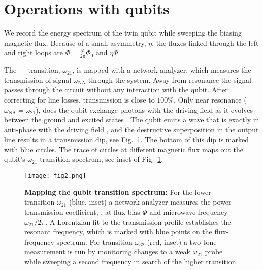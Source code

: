 
\section{Operations with qubits}
\label{sec:characterisation}


\noindent We record the energy spectrum of  the twin qubit while sweeping the biasing magnetic
flux.  Because of a  small asymmetry, $\eta$, the fluxes linked through the  left and right loops
are $ \Phi = \frac{\varphi}{2\pi}\Phi_0$ and $ \eta\Phi $.

The ~\ilra~  transition, $\omega_{21}$,  is mapped with  a network  analyzer, which
measures the transmission  of signal $\omega_{\text{NA}}$ through the system.   Away from resonance
the signal passes through the circuit without any interaction with the qubit. After correcting
for   line   losses,  transmission   is   close   to  $   100\%   $.    Only  near   resonance
($\omega_{\text{NA}}=\omega_{21}$), does the qubit exchange photons with the driving field as it evolves
between the ground and excited states \cite{rabi}.  The  qubit emits a wave that is exactly in
anti-phase with the driving field \cite{abdumalikov2010}, and the destructive superposition in
the output line results in a transmission dip, see Fig.~\ref{fig:transmission}.  The bottom of
this dip is marked with blue circles. The trace of circles at different magnetic flux maps out
the qubit's $\omega_{21}$ transition spectrum, see inset of Fig.~\ref{fig:transmission}.

\begin{figure}[h]
  \centering \texttt{[image: fig2.png]}
  \caption{\small \textbf{Mapping  the qubit transition  spectrum:}  For the  lower transition
    $\omega_{21}$ (blue,  inset) a  network analyzer measures  the power  transmission coefficient,
    , at flux  bias $ \Phi $  and microwave frequency $  \omega_{21}/2\pi$.  A Lorentzian
    fit \cite{Astafiev2010}  to the transmission  profile establishes the  resonant frequency,
    which  is  marked  with  blue  points on  the  flux-frequency  spectrum.   For  transition
    $\omega_{32}$  (red, inset)  a two-tone  measurement is  run by  monitoring changes  to a  weak
    $\omega_{21}$ probe while sweeping a second frequency  in search of the higher transition.
  }
  \label{fig:transmission}
\end{figure}

